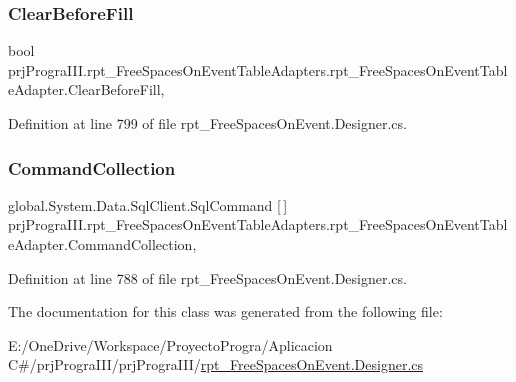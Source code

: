 \subsubsection{\texorpdfstring{Clear\+Before\+Fill}{ClearBeforeFill}}
{\footnotesize\ttfamily bool prj\+Progra\+I\+I\+I.\+rpt\+\_\+\+Free\+Spaces\+On\+Event\+Table\+Adapters.\+rpt\+\_\+\+Free\+Spaces\+On\+Event\+Table\+Adapter.\+Clear\+Before\+Fill\hspace{0.3cm}{\ttfamily [get]}, {\ttfamily [set]}}



Definition at line 799 of file rpt\+\_\+\+Free\+Spaces\+On\+Event.\+Designer.\+cs.

\hypertarget{classprj_progra_i_i_i_1_1rpt___free_spaces_on_event_table_adapters_1_1rpt___free_spaces_on_event_table_adapter_aeb07de485c1ea74c03d2d044c1f8baab}{}\label{classprj_progra_i_i_i_1_1rpt___free_spaces_on_event_table_adapters_1_1rpt___free_spaces_on_event_table_adapter_aeb07de485c1ea74c03d2d044c1f8baab} 
\subsubsection{\texorpdfstring{Command\+Collection}{CommandCollection}}
{\footnotesize\ttfamily global.\+System.\+Data.\+Sql\+Client.\+Sql\+Command \mbox{[}$\,$\mbox{]} prj\+Progra\+I\+I\+I.\+rpt\+\_\+\+Free\+Spaces\+On\+Event\+Table\+Adapters.\+rpt\+\_\+\+Free\+Spaces\+On\+Event\+Table\+Adapter.\+Command\+Collection\hspace{0.3cm}{\ttfamily [get]}, {\ttfamily [protected]}}



Definition at line 788 of file rpt\+\_\+\+Free\+Spaces\+On\+Event.\+Designer.\+cs.



The documentation for this class was generated from the following file\+:\begin{DoxyCompactItemize}
\item 
E\+:/\+One\+Drive/\+Workspace/\+Proyecto\+Progra/\+Aplicacion C\#/prj\+Progra\+I\+I\+I/prj\+Progra\+I\+I\+I/\hyperlink{rpt___free_spaces_on_event_8_designer_8cs}{rpt\+\_\+\+Free\+Spaces\+On\+Event.\+Designer.\+cs}\end{DoxyCompactItemize}
